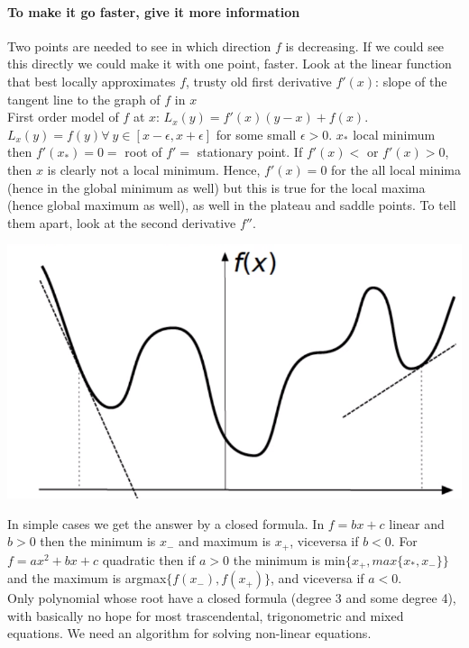 \documentclass[10pt]{report}
\begin{document}
\paragraph{To make it go faster, give it more information} Two points are needed to see in which direction $f$ is decreasing. If we could see this directly we could make it with one point, faster. Look at the linear function that best locally approximates $f$, trusty old first derivative $f'(x)$: slope of the tangent line to the graph of $f$ in $x$\\
First order model of $f$ at $x$: $L_x(y)=f'(x)(y-x) + f(x)$. $L_x(y) = f(y) \forall\:y\in[x-\epsilon, x+\epsilon]$ for some small $\epsilon > 0$. $x_*$ local minimum then $f'(x_*) = 0 =$ root of $f' =$ stationary point. If $f'(x) < $ or $f'(x) > 0$, then $x$ is clearly not a local minimum. Hence, $f'(x) = 0$ for the all local minima (hence in the global minimum as well) but this is true for the local maxima (hence global maximum as well), as well in the plateau and saddle points. To tell them apart, look at the second derivative $f''$.
\begin{center}
	\includegraphics[scale=0.5]{1.png}
\end{center}
In simple cases we get the answer by a closed formula. In $f = bx + c$ linear and $b > 0$ then the minimum is $x_-$ and maximum is $x_+$, viceversa if $b < 0$. For $f = ax^2 + bx + c$ quadratic then if $a > 0$ the minimum is min$\{ x_+, max\{x_*, x_-\}\}$ and the maximum is argmax$\{f(x_-), f(x_+)\}$, and viceversa if $a < 0$.\\
Only polynomial whose root have a closed formula (degree 3 and some degree 4), with basically no hope for most trascendental, trigonometric and mixed equations. We need an algorithm for solving non-linear equations.
\end{document}
